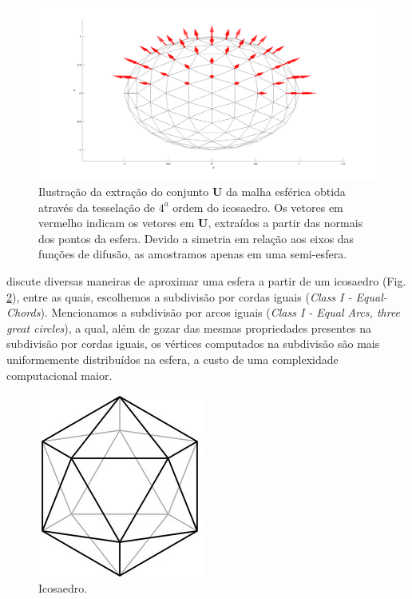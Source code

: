 \documentclass[
    12pt,                %
    oneside,            %
    a4paper,            %
    english,            %
    french,                %
    spanish,            %
    brazil                %
    ]{abntex2}
\begin{document}
 \begin{figure}[ht]
     \centering
     \includegraphics[width=.8\linewidth, angle=0]{figs/HARDI/icosphere_normals.png}
     \caption{
     Ilustração da extração do conjunto $\mathbf{U}$ da malha esférica obtida através da tesselação de $4^a$ ordem do icosaedro. Os vetores em vermelho indicam os vetores em $\mathbf{U}$, extraídos a partir das normais dos pontos da esfera. Devido a simetria em relação aos eixos das funções de difusão, as amostramos apenas em uma semi-esfera.%
     }
     \label{fig::direcoes}
   \hspace{1pt}
 \end{figure}

 discute diversas maneiras de aproximar uma esfera a partir de um icosaedro (Fig. \ref{fig::icosaedro}), entre as quais, escolhemos a subdivisão por cordas iguais  (\textit{Class I - Equal-Chords}).  Mencionamos a subdivisão por arcos iguais (\textit{Class I - Equal Arcs, three great circles}), a qual, além de gozar das mesmas propriedades presentes na subdivisão por cordas iguais, os vértices computados na subdivisão são mais uniformemente distribuídos na esfera, a custo de uma complexidade computacional maior.

\begin{figure}[ht]
    \centering
    \includegraphics[width=.3\linewidth, angle=0]{figs/HARDI/icosaedro.png}
    \caption{
    Icosaedro.
    }
    \label{fig::icosaedro}
   \hspace{1pt}
\end{figure}
\end{document}
